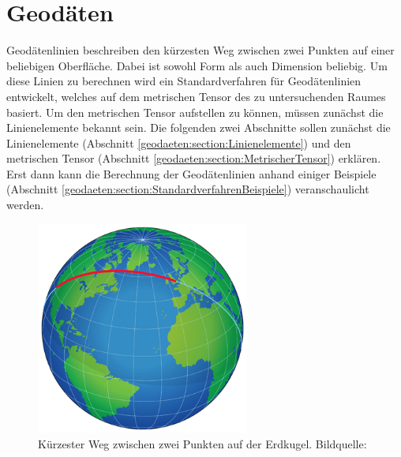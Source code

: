 %
%
%
%
\chapter{Geodäten\label{chapter:geodaeten}}
\begin{refsection}

Geodätenlinien beschreiben den kürzesten Weg zwischen zwei Punkten auf einer beliebigen Oberfläche.
Dabei ist sowohl Form als auch Dimension beliebig.
Um diese Linien zu berechnen wird ein Standardverfahren für Geodätenlinien entwickelt, welches auf dem metrischen Tensor des zu untersuchenden Raumes basiert.
Um den metrischen Tensor aufstellen zu können, müssen zunächst die Linienelemente bekannt sein.
Die folgenden zwei Abschnitte sollen zunächst die Linienelemente (Abschnitt \ref{geodaeten:section:Linienelemente}) und den metrischen Tensor (Abschnitt \ref{geodaeten:section:MetrischerTensor}) erklären.
Erst dann kann die Berechnung der Geodätenlinien anhand einiger Beispiele (Abschnitt \ref{geodaeten:section:StandardverfahrenBeispiele}) veranschaulicht werden.

\begin{figure}
	\centering
	\includegraphics[width=7cm]{papers/geodaeten/Abbildungen/Orthodromic_air_route}
	\caption{Kürzester Weg zwischen zwei Punkten auf der Erdkugel. Bildquelle: \cite{geodaeten:Geodäte}}
	\label{geodaeten:figure:Geodaeten:Erdkugel}
\end{figure}






\printbibliography[heading=subbibliography]
\end{refsection}
